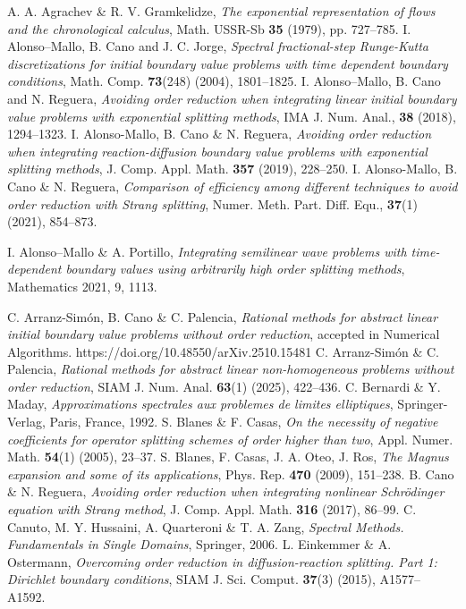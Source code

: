 \documentclass[a4paper,12pt]{article}
\begin{document}
\begin{thebibliography}{}
 A. A. Agrachev \& R. V. Gramkelidze, {\it The exponential representation of flows and the chronological calculus}, Math. USSR-Sb \textbf{35} (1979), pp. 727--785.
 I. Alonso--Mallo, B. Cano and J. C. Jorge, {\it Spectral fractional-step Runge-Kutta discretizations for initial boundary value problems with time dependent boundary conditions}, Math. Comp. \textbf{73}(248) (2004), 1801--1825.
 I. Alonso--Mallo, B. Cano and N. Reguera, {\it Avoiding order reduction when integrating linear initial boundary value
problems with exponential splitting methods}, IMA J. Num. Anal., \textbf{38} (2018), 1294--1323.
 I. Alonso-Mallo, B. Cano \& N. Reguera, {\it Avoiding order reduction when integrating reaction-diffusion boundary value problems with exponential splitting methods}, J. Comp. Appl. Math. \textbf{357} (2019), 228--250.
 I. Alonso-Mallo, B. Cano \& N. Reguera, {\it Comparison of efficiency among different techniques to avoid order reduction with Strang splitting},
Numer. Meth. Part. Diff. Equ., \textbf{37}(1)  (2021), 854--873.


 I. Alonso--Mallo \& A. Portillo, {\it Integrating semilinear wave problems with time-dependent boundary values using arbitrarily high order splitting methods}, Mathematics 2021, 9, 1113.

 C. Arranz-Sim\'on, B. Cano \& C. Palencia, {\it Rational methods for abstract linear initial boundary value problems without order reduction}, accepted in Numerical Algorithms. https://doi.org/10.48550/arXiv.2510.15481
 C. Arranz-Sim\'on \& C. Palencia, {\it Rational methods for abstract linear non-homogeneous problems without order reduction}, SIAM J. Num. Anal. \textbf{63}(1) (2025), 422--436.
 C. Bernardi \& Y. Maday, {\it Approximations spectrales aux problemes de limites elliptiques}, Springer-Verlag, Paris, France, 1992.
 S. Blanes \& F. Casas, {\it On the necessity of negative coefficients for operator splitting schemes of order higher than two}, Appl. Numer. Math. \textbf{54}(1) (2005), 23--37.
 S. Blanes, F. Casas, J. A. Oteo, J. Ros, {\it The Magnus expansion and some of its applications}, Phys. Rep.  \textbf{470} (2009), 151--238.
 B. Cano \& N. Reguera,
{\it Avoiding order reduction when integrating nonlinear
Schr\"odinger equation with Strang method}, J. Comp. Appl.  Math. \textbf{316} (2017), 86--99.
 C. Canuto, M. Y. Hussaini, A. Quarteroni \& T. A. Zang, {\it Spectral Methods. Fundamentals in Single Domains}, Springer, 2006.
  L. Einkemmer \& A. Ostermann,
{\it Overcoming order reduction in diffusion-reaction splitting.
Part 1: Dirichlet boundary conditions},  SIAM J. Sci. Comput.
\textbf{37}(3)  (2015), A1577--A1592.


\end{thebibliography}
\end{document}

